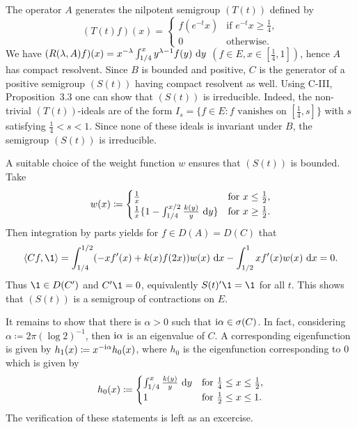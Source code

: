\begin{example}
The operator $A$ generates the nilpotent semigroup $(T(t))$ defined by
\begin{equation*}\label{eq:c4-2.13-kgk}
(T(t)f)(x) = \begin{cases}
    f(e^{-t}x) & \text{if } e^{-t}x \geq \frac{1}{4}, \\
    0 & \text{otherwise}.
\end{cases}
\end{equation*}
We have $(R(\lambda,A)f)(x) = x^{-\lambda}\int_{1/4}^{x} y^{\lambda-1}f(y) \, \mathop{}\!\mathrm{d}{y}$ $(f \in E, x \in [\frac{1}{4},1])$, hence $A$ has compact resolvent.
Since $B$ is bounded and positive, $C$ is the generator of a positive semigroup $(S(t))$ having compact resolvent as well.
Using C-III, Proposition~3.3 one can show that $(S(t))$ is irreducible.
Indeed, the non-trivial $(T(t))$-ideals are of the form $I_{s} = \{f \in E \colon f \text{ vanishes on } [\frac{1}{4},s]\}$ with $s$ satisfying $\frac{1}{4} < s < 1$.
Since none of these ideals is invariant under $B$, the semigroup $(S(t))$ is irreducible.

A suitable choice of the weight function $w$ ensures that $(S(t))$ is bounded.
Take
\begin{equation}\label{eq:c4-2.14}
w(x) \coloneqq \begin{cases}
    \frac{1}{x} & \text{for } x \leq \frac{1}{2}, \\
    \frac{1}{x}\{1 - \int_{1/4}^{x/2} \frac{k(y)}{y} \, \mathop{}\!\mathrm{d}{y} \} & \text{for } x \geq \frac{1}{2}.
\end{cases}
\end{equation}
Then integration by parts yields for $f \in D(A) = D(C)$ that
\begin{align*}
\langle Cf,\1 \rangle = \int_{1/4}^{1/2} (-xf'(x) + k(x)f(2x))w(x) \, \dx - \int_{1/2}^{1} xf'(x)w(x) \, \dx = 0.
\end{align*}
Thus $\1 \in D(C')$ and $C'\1 = 0$, equivalently $S(t)'\1 = \1$ for all $t$.
This shows that $(S(t))$ is a semigroup of contractions on $E$.

It remains to show that there is $\alpha > 0$ such that $\mathrm{i}\alpha \in \sigma(C)$.
In fact, considering $\alpha \coloneqq 2\pi(\log 2)^{-1}$,  then $\mathrm{i}\alpha$ is an eigenvalue of $C$.
A corresponding eigenfunction is given by $h_{1}(x) \coloneq  x^{-\mathrm{i}\alpha}h_{0}(x)$, where $h_{0}$ is the eigenfunction corresponding to $0$ which is given by
\begin{equation}\label{eq:c4-2.15}
h_{0}(x) \coloneq  \begin{cases}
    \int_{1/4}^{x} \frac{k(y)}{y} \, \mathop{}\!\mathrm{d}{y} & \text{for } \frac{1}{4} \leq x \leq \frac{1}{2}, \\
    1 & \text{for } \frac{1}{2} \leq x \leq 1.
\end{cases}
\end{equation}
The verification of these statements is left as an excercise.
\end{example}

